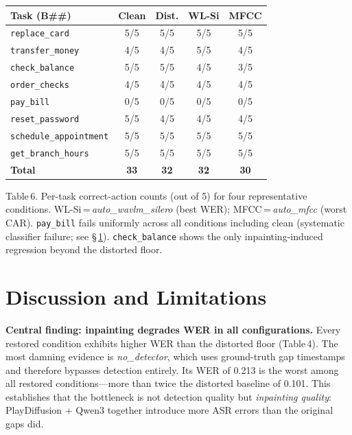 \documentclass[9pt,twocolumn]{article}
\begin{document}
{\footnotesize\setlength{\tabcolsep}{2.8pt}
\begin{tabularx}{\columnwidth}{lcccc}
\toprule
\textbf{Task (B\#\#)} &
  \textbf{Clean} & \textbf{Dist.} &
  \textbf{WL-Si} & \textbf{MFCC} \\
\midrule
\texttt{replace\_card}           & 5/5 & 5/5 & 5/5 & 5/5 \\
\texttt{transfer\_money}         & 4/5 & 4/5 & 5/5 & 4/5 \\
\texttt{check\_balance}          & 5/5 & 5/5 & 4/5 & 3/5 \\
\texttt{order\_checks}           & 4/5 & 4/5 & 4/5 & 4/5 \\
\rowcolor{cCut!10}
\texttt{pay\_bill}               & 0/5 & 0/5 & 0/5 & 0/5 \\
\texttt{reset\_password}         & 5/5 & 4/5 & 4/5 & 4/5 \\
\texttt{schedule\_appointment}   & 5/5 & 5/5 & 5/5 & 5/5 \\
\texttt{get\_branch\_hours}      & 5/5 & 5/5 & 5/5 & 5/5 \\
\midrule
\textbf{Total}                   & \textbf{33} & \textbf{32} & \textbf{32} & \textbf{30} \\
\bottomrule
\end{tabularx}
}
\vspace{1pt}
{\tiny Table\,6.
Per-task correct-action counts (out of 5) for four representative
conditions.
WL-Si\,=\,\textit{auto\_wavlm\_silero} (best WER);
MFCC\,=\,\textit{auto\_mfcc} (worst CAR).
\texttt{pay\_bill} fails uniformly across all conditions including clean
(systematic classifier failure; see §\,\ref{sec:discussion}).
\texttt{check\_balance} shows the only inpainting-induced regression
beyond the distorted floor.}

\section{Discussion and Limitations}
\label{sec:discussion}

\noindent\textbf{Central finding: inpainting degrades WER in all
configurations.}
Every restored condition exhibits higher WER than the distorted floor
(Table\,4).
The most damning evidence is \textit{no\_detector}, which uses
ground-truth gap timestamps and therefore bypasses detection entirely.
Its WER of 0.213 is the worst among all restored conditions---more
than twice the distorted baseline of 0.101.
This establishes that the bottleneck is not detection quality but
\emph{inpainting quality}: PlayDiffusion + Qwen3 together introduce
more ASR errors than the original gaps did.
\end{document}
